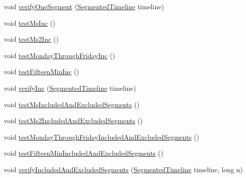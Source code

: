 \begin{DoxyCompactItemize}
\item 
void \mbox{\hyperlink{classorg_1_1jfree_1_1chart_1_1axis_1_1_segmented_timeline_test_aba4f8e62a3d03229adc65c892923188b}{verify\+One\+Segment}} (\mbox{\hyperlink{classorg_1_1jfree_1_1chart_1_1axis_1_1_segmented_timeline}{Segmented\+Timeline}} timeline)
\item 
void \mbox{\hyperlink{classorg_1_1jfree_1_1chart_1_1axis_1_1_segmented_timeline_test_a90f780c17eb80be4596c5cf1353cf413}{test\+Ms\+Inc}} ()
\item 
void \mbox{\hyperlink{classorg_1_1jfree_1_1chart_1_1axis_1_1_segmented_timeline_test_a7f6e9c71fe1638c83a06a3ee3ca0d8cf}{test\+Ms2\+Inc}} ()
\item 
void \mbox{\hyperlink{classorg_1_1jfree_1_1chart_1_1axis_1_1_segmented_timeline_test_ab40650b760f2f6aafdcaea96dded35df}{test\+Monday\+Through\+Friday\+Inc}} ()
\item 
void \mbox{\hyperlink{classorg_1_1jfree_1_1chart_1_1axis_1_1_segmented_timeline_test_a4ab9afd503fc56dd9d998ebf42d5249b}{test\+Fifteen\+Min\+Inc}} ()
\item 
void \mbox{\hyperlink{classorg_1_1jfree_1_1chart_1_1axis_1_1_segmented_timeline_test_a893c7a757e285feccaa909d8976fc606}{verify\+Inc}} (\mbox{\hyperlink{classorg_1_1jfree_1_1chart_1_1axis_1_1_segmented_timeline}{Segmented\+Timeline}} timeline)
\item 
void \mbox{\hyperlink{classorg_1_1jfree_1_1chart_1_1axis_1_1_segmented_timeline_test_aadb4a6748c8273767ce6b4e9f42f0427}{test\+Ms\+Included\+And\+Excluded\+Segments}} ()
\item 
void \mbox{\hyperlink{classorg_1_1jfree_1_1chart_1_1axis_1_1_segmented_timeline_test_a1736d4b53454ecb7321c962e407d0c7b}{test\+Ms2\+Included\+And\+Excluded\+Segments}} ()
\item 
void \mbox{\hyperlink{classorg_1_1jfree_1_1chart_1_1axis_1_1_segmented_timeline_test_a51d38e1d4456120b5f80d23213bba285}{test\+Monday\+Through\+Friday\+Included\+And\+Excluded\+Segments}} ()
\item 
void \mbox{\hyperlink{classorg_1_1jfree_1_1chart_1_1axis_1_1_segmented_timeline_test_aafa63ec1d9b7449819fb89d1fd5da3f6}{test\+Fifteen\+Min\+Included\+And\+Excluded\+Segments}} ()
\item 
void \mbox{\hyperlink{classorg_1_1jfree_1_1chart_1_1axis_1_1_segmented_timeline_test_a8cf186f08a8a91f01952b1e7d0e66f8d}{verify\+Included\+And\+Excluded\+Segments}} (\mbox{\hyperlink{classorg_1_1jfree_1_1chart_1_1axis_1_1_segmented_timeline}{Segmented\+Timeline}} timeline, long n)
\item 

\end{DoxyCompactItemize}
